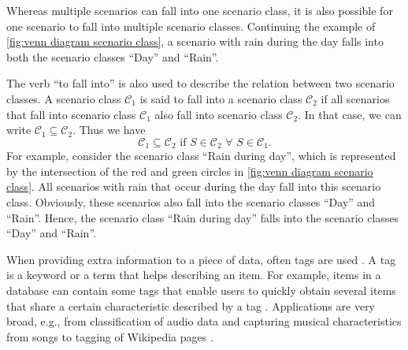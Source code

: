 Whereas multiple scenarios can fall into one scenario class, it is also possible for one scenario to fall into multiple scenario classes. Continuing the example of \cref{fig:venn diagram scenario class}, a scenario with rain during the day falls into both the scenario classes ``Day'' and ``Rain''.

\cbstart
The verb ``to fall into'' is also used to describe the relation between two scenario classes. A scenario class $\mathcal{C}_1$ is said to fall into a scenario class $\mathcal{C}_2$ if all scenarios that fall into scenario class $\mathcal{C}_1$ also fall into scenario class $\mathcal{C}_2$. In that case, we can write $\mathcal{C}_1 \subseteq \mathcal{C}_2$. Thus we have
\begin{equation}
	\mathcal{C}_1 \subseteq \mathcal{C}_2 \text{ if } S \in \mathcal{C}_2 \,\,\forall\,\, S \in \mathcal{C}_1.
\end{equation}
\cbend
For example, consider the scenario class ``Rain during day'', which is represented by the intersection of the red and green circles in \cref{fig:venn diagram scenario class}. All scenarios with rain that occur during the day fall into this scenario class. Obviously, these scenarios also fall into the scenario classes ``Day'' and ``Rain''. Hence, the scenario class ``Rain during day'' falls into the scenario classes ``Day'' and ``Rain''.

When providing extra information to a piece of data, often tags are used \cite{smith2007tagging}. A tag is a keyword or a term that helps describing an item. For example, items in a database can contain some tags that enable users to quickly obtain several items that share a certain characteristic described by a tag \cite{craft2004tagging, vasquez2019controlling}. Applications are very broad, e.g., from classification of audio data \cite{kong2017joint} and capturing musical characteristics from songs \cite{ellis2011semantic} to tagging of Wikipedia pages \cite{voss2006collaborative}.

